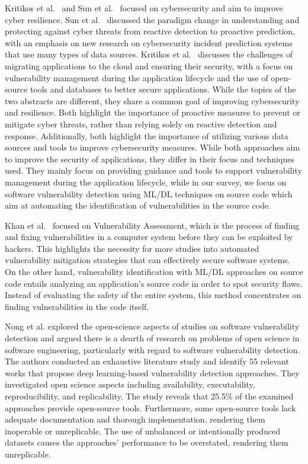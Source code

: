 Kritikos et al.~\cite{kritikos2019survey} and Sun et al.~\cite{sun2018data} focused on cybersecurity and aim to improve cyber resilience. Sun et al.~\cite{sun2018data} discussed the paradigm change in understanding and protecting against cyber threats from reactive detection to proactive prediction, with an emphasis on new research on cybersecurity incident prediction systems that use many types of data sources. Kritikos et al.~\cite{kritikos2019survey} discusses the challenges of migrating applications to the cloud and ensuring their security, with a focus on vulnerability management during the application lifecycle and the use of open-source tools and databases to better secure applications. While the topics of the two abstracts are different, they share a common goal of improving cybersecurity and resilience. Both highlight the importance of proactive measures to prevent or mitigate cyber threats, rather than relying solely on reactive detection and response. Additionally, both highlight the importance of utilizing various data sources and tools to improve cybersecurity measures. While both approaches aim to improve the security of applications, they differ in their focus and techniques used. They mainly focus on providing guidance and tools to support vulnerability management during the application lifecycle, while in our survey, we focus on software vulnerability detection using ML/DL techniques on source code which aim at automating the identification of vulnerabilities in the source code.

Khan et al.~\cite{khan2018review} focused on Vulnerability Assessment, which is the process of finding and fixing vulnerabilities in a computer system before they can be exploited by hackers. This highlights the necessity for more studies into automated vulnerability mitigation strategies that can effectively secure software systems. On the other hand, vulnerability identification with ML/DL approaches on source code entails analyzing an application's source code in order to spot security flaws. Instead of evaluating the safety of the entire system, this method concentrates on finding vulnerabilities in the code itself.

Nong et al.\cite{nong2022open} explored the open-science aspects of studies on software vulnerability detection and argued there is a dearth of research on problems of open science in software engineering, particularly with regard to software vulnerability detection. The authors conducted an exhaustive literature study and identify 55 relevant works that propose deep learning-based vulnerability detection approaches. They investigated open science aspects including availability, executability, reproducibility, and replicability. The study reveals that 25.5\% of the examined approaches provide open-source tools. Furthermore, some open-source tools lack adequate documentation and thorough implementation, rendering them inoperable or unreplicable. The use of unbalanced or intentionally produced datasets causes the approaches' performance to be overstated, rendering them unreplicable.


